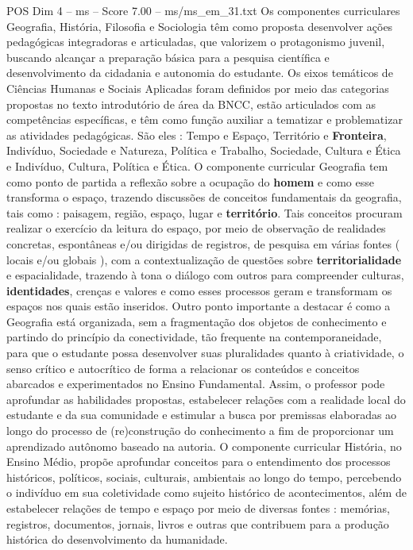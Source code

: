 \begin{textsample}{POS Dim 4 – ms – Score 7.00 – ms/ms\_em\_31.txt}
Os componentes curriculares Geografia, História, Filosofia e Sociologia têm como proposta desenvolver ações pedagógicas integradoras e articuladas, que valorizem o protagonismo juvenil, buscando alcançar a preparação básica para a pesquisa científica e desenvolvimento da cidadania e autonomia do estudante.
Os eixos temáticos de Ciências Humanas e Sociais Aplicadas foram definidos por meio das categorias propostas no texto introdutório de área da BNCC, estão articulados com as competências específicas, e têm como função auxiliar a tematizar e problematizar as atividades pedagógicas.
São eles : Tempo e Espaço, Território e \textbf{Fronteira}, Indivíduo, Sociedade e Natureza, Política e Trabalho, Sociedade, Cultura e Ética e Indivíduo, Cultura, Política e Ética.
O componente curricular Geografia tem como ponto de partida a reflexão sobre a ocupação do \textbf{homem} e como esse transforma o espaço, trazendo discussões de conceitos fundamentais da geografia, tais como : paisagem, região, espaço, lugar e \textbf{território}.
Tais conceitos procuram realizar o exercício da leitura do espaço, por meio de observação de realidades concretas, espontâneas e/ou dirigidas de registros, de pesquisa em várias fontes ( locais e/ou globais ), com a contextualização de questões sobre \textbf{territorialidade} e espacialidade, trazendo à tona o diálogo com outros para compreender culturas, \textbf{identidades}, crenças e valores e como esses processos geram e transformam os espaços nos quais estão inseridos.
Outro ponto importante a destacar é como a Geografia está organizada, sem a fragmentação dos objetos de conhecimento e partindo do princípio da conectividade, tão frequente na contemporaneidade, para que o estudante possa desenvolver suas pluralidades quanto à criatividade, o senso crítico e autocrítico de forma a relacionar os conteúdos e conceitos abarcados e experimentados no Ensino Fundamental.
Assim, o professor pode aprofundar as habilidades propostas, estabelecer relações com a realidade local do estudante e da sua comunidade e estimular a busca por premissas elaboradas ao longo do processo de (re)construção do conhecimento a fim de proporcionar um aprendizado autônomo baseado na autoria.
O componente curricular História, no Ensino Médio, propõe aprofundar conceitos para o entendimento dos processos históricos, políticos, sociais, culturais, ambientais ao longo do tempo, percebendo o indivíduo em sua coletividade como sujeito histórico de acontecimentos, além de estabelecer relações de tempo e espaço por meio de diversas fontes : memórias, registros, documentos, jornais, livros e outras que contribuem para a produção histórica do desenvolvimento da humanidade.

\end{textsample}
